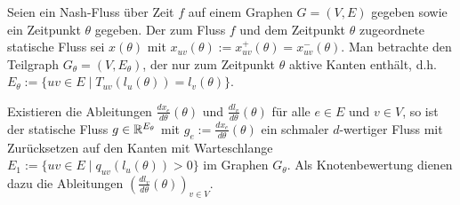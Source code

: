 \begin{theorem}
	Seien ein Nash-Fluss über Zeit $f$ auf einem Graphen $G=(V,E)$ gegeben sowie ein Zeitpunkt $\theta$ gegeben.
	Der zum Fluss $f$ und dem Zeitpunkt $\theta$ zugeordnete statische Fluss sei $x(\theta)$ mit $x_{uv}(\theta) := x^+_{uv}(\theta) = x^-_{uv}(\theta)$.
	Man betrachte den Teilgraph $G_\theta = (V, E_\theta)$, der nur zum Zeitpunkt $\theta$ aktive Kanten enthält, d.h. $E_\theta := \{ uv\in E \mid T_{uv}(l_u(\theta)) = l_v(\theta) \}$.
	
	Existieren die Ableitungen $\frac{dx_e}{d\theta}(\theta)$ und $\frac{dl_v}{d\theta}(\theta)$ für alle $e\in E$ und $v\in V$, so ist der statische Fluss $g\in\mathbb{R}^{E_\theta}$ mit $g_e:=\frac{dx_e}{d\theta}(\theta)$ ein schmaler $d$-wertiger Fluss mit Zurücksetzen auf den Kanten mit Warteschlange $E_1:=\{uv\in E \mid q_{uv}(l_u(\theta))>0 \}$ im Graphen $G_\theta$.
	Als Knotenbewertung dienen dazu die Ableitungen $(\frac{dl_v}{d\theta}(\theta))_{v\in V}$.
\end{theorem}

